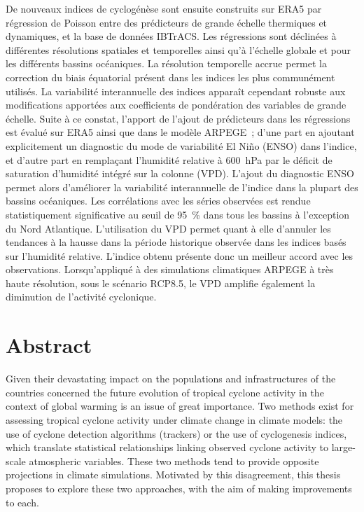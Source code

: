 \documentclass[12pt,twoside,openright]{book}
\newcommand{\hPa}[1]{\SI{#1}{\hecto\pascal}}
\newcommand{\prct}[1]{\SI{#1}{\percent}}
\begin{document}
De nouveaux indices de cyclogénèse sont ensuite construits sur ERA5 par régression de Poisson entre des prédicteurs de grande échelle thermiques et dynamiques,
et la base de données IBTrACS. Les régressions sont déclinées à différentes résolutions spatiales et temporelles ainsi qu'à l'échelle globale et pour les
différents bassins océaniques. La résolution temporelle accrue permet la correction du biais équatorial présent dans les indices les plus communément utilisés.
La variabilité interannuelle des indices apparaît cependant robuste aux modifications apportées aux coefficients de pondération des variables de grande échelle.
Suite à ce constat, l'apport de l'ajout de prédicteurs dans les régressions est évalué sur ERA5 ainsi que dans le modèle ARPEGE ; d’une part en ajoutant
explicitement un diagnostic du mode de variabilité El Niño (ENSO) dans l’indice, et d’autre part en remplaçant l'humidité relative à \hPa{600} par le déficit
de saturation d’humidité intégré sur la colonne (VPD). L’ajout du diagnostic ENSO permet alors d’améliorer la variabilité interannuelle de l'indice dans la
plupart des bassins océaniques. Les corrélations avec les séries observées est rendue statistiquement significative au seuil de \prct{95} dans tous les bassins
à l'exception du Nord Atlantique. L'utilisation du VPD permet quant à elle d’annuler les tendances à la hausse dans la période historique observée dans les
indices basés sur l'humidité relative. L'indice obtenu présente donc un meilleur accord avec les observations. Lorsqu'appliqué à des simulations climatiques
ARPEGE à très haute résolution, sous le scénario RCP8.5, le VPD amplifie également la diminution de l'activité cyclonique.

\chapter*{Abstract}

Given their devastating impact on the populations and infrastructures of the countries concerned the future evolution of tropical cyclone activity in the
context of global warming is an issue of great importance. Two methods exist for assessing tropical cyclone activity under climate change in climate models: the
use of cyclone detection algorithms (trackers) or the use of cyclogenesis indices, which translate statistical relationships linking observed cyclone activity
to large-scale atmospheric variables. These two methods tend to provide opposite projections in climate simulations. Motivated by this disagreement, this thesis
proposes to explore these two approaches, with the aim of making improvements to each.
\end{document}
